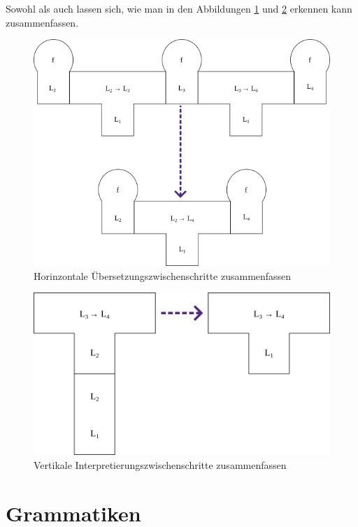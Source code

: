Sowohl  als auch  lassen sich, wie man in den Abbildungen \ref{fig:t_diagram_horinzontal_zusammenfassen} und \ref{fig:t_diagram_vertikal_zusammenfassen} erkennen kann zusammenfassen.

\begin{figure}[H]
  \centering
  \includegraphics[width=0.66\linewidth]{./figures/summarize_compiler.png}
  \caption{Horinzontale Übersetzungszwischenschritte zusammenfassen}
  \label{fig:t_diagram_horinzontal_zusammenfassen}
\end{figure}

\begin{figure}[H]
  \centering
  \includegraphics[width=0.5\linewidth]{./figures/summarize_interpreter.png}
  \caption{Vertikale Interpretierungszwischenschritte zusammenfassen}
  \label{fig:t_diagram_vertikal_zusammenfassen}
\end{figure}

\section{Grammatiken}
